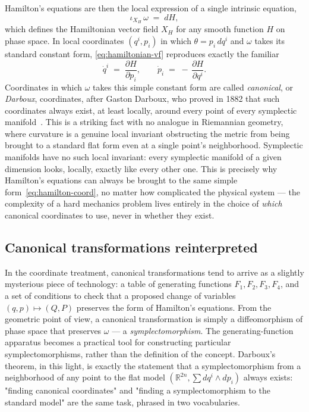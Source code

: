 Hamilton's equations are then the local expression of a single
intrinsic equation,
\begin{equation}
  \iota_{X_H}\,\omega \;=\; dH,
  \label{eq:hamiltonian-vf}
\end{equation}
which defines the Hamiltonian vector field $X_H$ for any smooth
function $H$ on phase space. In local coordinates $(q^i,p_i)$ in
which $\theta = p_i\,dq^i$ and $\omega$ takes its standard constant
form, \eqref{eq:hamiltonian-vf} reproduces exactly the familiar
\begin{equation}
  \dot q^i \;=\; \frac{\partial H}{\partial p_i},
  \qquad
  \dot p_i \;=\; -\,\frac{\partial H}{\partial q^i}.
  \label{eq:hamilton-coord}
\end{equation}
Coordinates in which $\omega$ takes this simple constant form are
called \emph{canonical}, or \emph{Darboux}, coordinates, after Gaston
Darboux, who proved in 1882 that such coordinates always exist, at
least locally, around every point of every symplectic
manifold~\cite{Darboux1882}. This is a striking fact with no analogue
in Riemannian geometry, where curvature is a genuine local invariant
obstructing the metric from being brought to a standard flat form
even at a single point's neighborhood. Symplectic manifolds have no
such local invariant: every symplectic manifold of a given dimension
looks, locally, exactly like every other one. This is precisely why
Hamilton's equations can always be brought to the same simple
form~\eqref{eq:hamilton-coord}, no matter how complicated the
physical system --- the complexity of a hard mechanics problem lives
entirely in the choice of \emph{which} canonical coordinates to use,
never in whether they exist.

\subsection{Canonical transformations reinterpreted}

In the coordinate treatment, canonical transformations tend to arrive
as a slightly mysterious piece of technology: a table of generating
functions $F_1,F_2,F_3,F_4$, and a set of conditions to check that a
proposed change of variables $(q,p)\mapsto(Q,P)$ preserves the form
of Hamilton's equations. From the geometric point of view, a
canonical transformation is simply a diffeomorphism of phase space
that preserves $\omega$ --- a \emph{symplectomorphism}. The
generating-function apparatus becomes a practical tool for
constructing particular symplectomorphisms, rather than the
definition of the concept. Darboux's theorem, in this light, is
exactly the statement that a symplectomorphism from a neighborhood
of any point to the flat model $(\mathbb R^{2n}, \sum dq^i\wedge
dp_i)$ always exists: "finding canonical coordinates" and "finding a
symplectomorphism to the standard model" are the same task, phrased
in two vocabularies.


